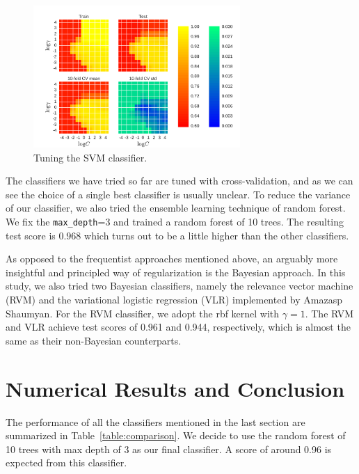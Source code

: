 \documentclass{article}
\begin{document}
\begin{figure}[h]
  \centering
  \includegraphics[width=0.7\textwidth]{figs/svc_tuning.pdf}
  \caption{Tuning the SVM classifier.}
  \label{fig:svc_tune}
\end{figure}

The classifiers we have tried so far are tuned with cross-validation, and as we
can see the choice of a single best classifier is usually unclear. To reduce the
variance of our classifier, we also tried the ensemble learning technique of
random forest. We fix the \texttt{max\_depth}=3 and trained a random forest of
10 trees. The resulting test score is $0.968$ which turns out to be a little
higher than the other classifiers.

As opposed to the frequentist approaches mentioned above, an arguably more
insightful and principled way of regularization is the Bayesian
approach.
In this study, we also tried two Bayesian classifiers, namely the relevance
vector machine (RVM) and the variational logistic
regression (VLR) implemented by Amazasp Shaumyan. For the RVM
classifier, we adopt the rbf kernel with $\gamma=1$. The RVM and VLR achieve
test scores of 0.961 and 0.944, respectively, which is almost the same as their
non-Bayesian counterparts.

\section{Numerical Results and Conclusion}
The performance of all the classifiers mentioned in the last section are
summarized in Table~\ref{table:comparison}. We decide to use the random forest
of 10 trees with max depth of 3 as our final classifier. A score of around 0.96
is expected from this classifier.
\end{document}
